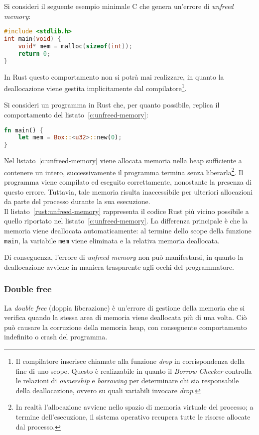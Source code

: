 Si consideri il seguente esempio minimale C che genera un'errore di \textit{unfreed memory}:
\begin{lstlisting}[language=C, caption={Unfreed memory in C}, label={c:unfreed-memory}]
#include <stdlib.h>
int main(void) {
    void* mem = malloc(sizeof(int));
    return 0;
}
\end{lstlisting}
In Rust questo comportamento non si potrà mai realizzare, in quanto la deallocazione viene gestita implicitamente dal compilatore\footnote{Il compilatore inserisce chiamate alla funzione \textit{drop} in corrispondenza della fine di uno scope. Questo è realizzabile in quanto il \textit{Borrow Checker} controlla le relazioni di \textit{ownership} e \textit{borrowing} per determinare chi sia responsabile della deallocazione, ovvero su quali variabili invocare \textit{drop}.}. \hfill

\noindent Si consideri un programma in Rust che, per quanto possibile, replica il comportamento del listato~\ref{c:unfreed-memory}:
\begin{lstlisting}[language=Rust, caption={Unfreed memory in Rust}, label={rust:unfreed-memory}]
fn main() {
    let mem = Box::<u32>::new(0);
}
\end{lstlisting}
Nel listato~\ref{c:unfreed-memory} viene allocata memoria nella heap sufficiente a contenere un intero, successivamente 
il programma termina senza liberarla\footnote{In realtà l'allocazione avviene nello spazio di memoria virtuale del processo; a termine dell'esecuzione, il sistema operativo recupera tutte le risorse allocate dal processo.}. 
Il programma viene compilato ed eseguito correttamente, 
nonostante la presenza di questo errore. 
Tuttavia, tale memoria risulta inaccessibile per ulteriori allocazioni da parte del processo durante la sua esecuzione.\hfill
\vspace{10pt}\\
\noindent Il listato~\ref{rust:unfreed-memory} rappresenta il codice Rust più vicino possibile a 
quello riportato nel listato~\ref{c:unfreed-memory}. La differenza principale è che la memoria viene deallocata automaticamente: 
al termine dello scope della funzione \texttt{main}, la variabile \texttt{mem} viene eliminata e la relativa 
memoria deallocata. 

Di conseguenza, l'errore di \textit{unfreed memory} non può manifestarsi, in quanto la deallocazione avviene in maniera 
trasparente agli occhi del programmatore. 


\subsubsection{Double free}
La \textit{double free} (doppia liberazione) è un'errore di gestione della memoria che si verifica quando la stessa area di memoria viene deallocata
più di una volta. Ciò può causare la corruzione della memoria heap, con conseguente comportamento indefinito o crash del programma.

